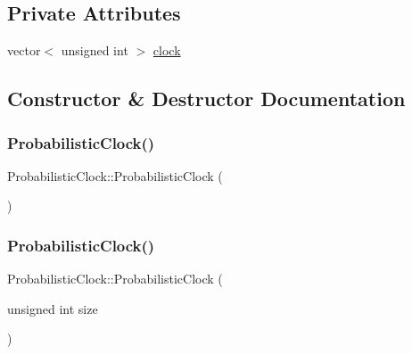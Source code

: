 \subsection*{Private Attributes}
\begin{DoxyCompactItemize}
\item 
vector$<$ unsigned int $>$ \hyperlink{classProbabilisticClock_a4839958d0e2368cec8bb159b69ac0e76}{clock}
\end{DoxyCompactItemize}


\subsection{Constructor \& Destructor Documentation}
\mbox{\label{classProbabilisticClock_aa879f0e457bc70644b6e4f2114215987}} 
\subsubsection{\texorpdfstring{Probabilistic\+Clock()}{ProbabilisticClock()}\hspace{0.1cm}{\footnotesize\ttfamily [1/2]}}
{\footnotesize\ttfamily Probabilistic\+Clock\+::\+Probabilistic\+Clock (\begin{DoxyParamCaption}{ }\end{DoxyParamCaption})}

\mbox{\label{classProbabilisticClock_ab356688e8403176b4211349cba56b9b1}} 
\subsubsection{\texorpdfstring{Probabilistic\+Clock()}{ProbabilisticClock()}\hspace{0.1cm}{\footnotesize\ttfamily [2/2]}}
{\footnotesize\ttfamily Probabilistic\+Clock\+::\+Probabilistic\+Clock (\begin{DoxyParamCaption}\item[{unsigned int}]{size }\end{DoxyParamCaption})}

